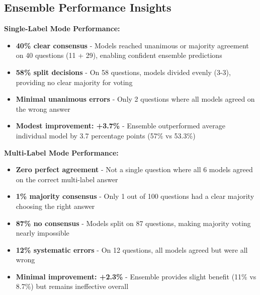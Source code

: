 \documentclass[12pt,a4paper]{article}
\begin{document}


\subsection{Ensemble Performance Insights}

\textbf{Single-Label Mode Performance:}
\begin{itemize}[leftmargin=*]
    \item \textbf{40\% clear consensus} - Models reached unanimous or majority agreement on 40 questions (11 + 29), enabling confident ensemble predictions
    
    \item \textbf{58\% split decisions} - On 58 questions, models divided evenly (3-3), providing no clear majority for voting
    
    \item \textbf{Minimal unanimous errors} - Only 2 questions where all models agreed on the wrong answer
    
    \item \textbf{Modest improvement: +3.7\%} - Ensemble outperformed average individual model by 3.7 percentage points (57\% vs 53.3\%)
\end{itemize}

\textbf{Multi-Label Mode Performance:}
\begin{itemize}[leftmargin=*]
    \item \textbf{Zero perfect agreement} - Not a single question where all 6 models agreed on the correct multi-label answer
    
    \item \textbf{1\% majority consensus} - Only 1 out of 100 questions had a clear majority choosing the right answer
    
    \item \textbf{87\% no consensus} - Models split on 87 questions, making majority voting nearly impossible
    
    \item \textbf{12\% systematic errors} - On 12 questions, all models agreed but were all wrong
    
    \item \textbf{Minimal improvement: +2.3\%} - Ensemble provides slight benefit (11\% vs 8.7\%) but remains ineffective overall
\end{itemize}
\end{document}
